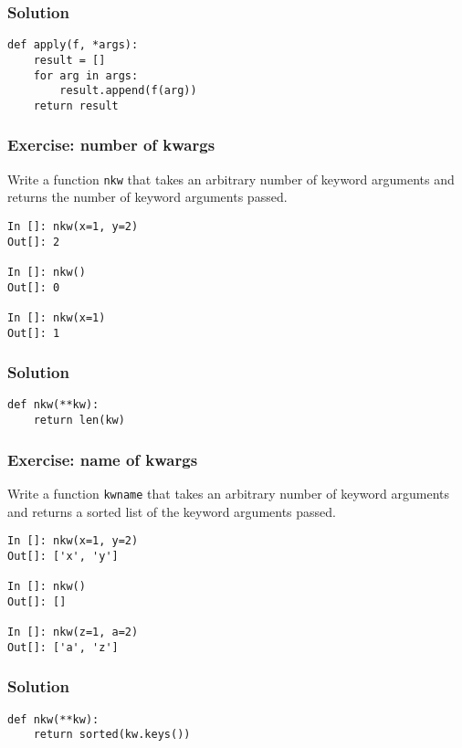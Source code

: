 \documentclass[14pt,compress,aspectratio=169]{beamer}
\begin{document}
\begin{frame}
  \frametitle{Solution}
\begin{lstlisting}
def apply(f, *args):
    result = []
    for arg in args:
        result.append(f(arg))
    return result
\end{lstlisting}
\end{frame}

\begin{frame}
  \frametitle{Exercise: number of kwargs}
  \begin{block}{}
    Write a function \lstinline{nkw} that takes an arbitrary number of
    keyword arguments and returns the number of keyword arguments passed.
  \end{block}

\begin{lstlisting}
In []: nkw(x=1, y=2)
Out[]: 2

In []: nkw()
Out[]: 0

In []: nkw(x=1)
Out[]: 1
\end{lstlisting}
\end{frame}


\begin{frame}
  \frametitle{Solution}
\begin{lstlisting}
def nkw(**kw):
    return len(kw)
\end{lstlisting}
\end{frame}

\begin{frame}
  \frametitle{Exercise: name of kwargs}
  \begin{block}{}
    Write a function \lstinline{kwname} that takes an arbitrary number of
    keyword arguments and returns a sorted list of the keyword arguments
    passed.
  \end{block}

\begin{lstlisting}
In []: nkw(x=1, y=2)
Out[]: ['x', 'y']

In []: nkw()
Out[]: []

In []: nkw(z=1, a=2)
Out[]: ['a', 'z']
\end{lstlisting}
\end{frame}


\begin{frame}
  \frametitle{Solution}
\begin{lstlisting}
def nkw(**kw):
    return sorted(kw.keys())
\end{lstlisting}
\end{frame}
\end{document}
